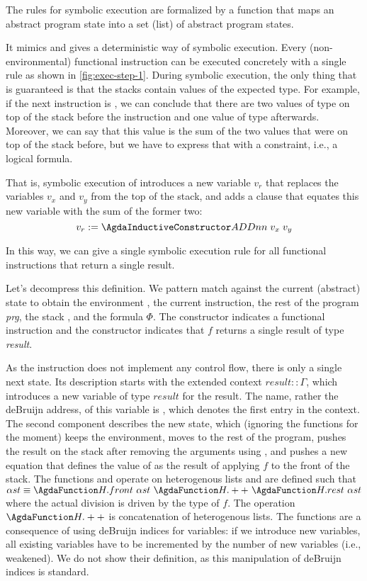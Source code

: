 The rules for symbolic execution are formalized by a function that
maps an abstract program state into a set (list) of abstract program states.
\AbstractProgStep

It mimics  and gives a deterministic way of symbolic execution.
Every (non-environmental) functional instruction can be executed concretely
with a single rule as shown in \autoref{fig:exec-step-1}.
During symbolic execution, the only thing that is guaranteed is
that the stacks contain values of the expected type.
For example, if the next instruction is , we can conclude
that there are two values of type  on top of the stack
before the instruction and one value of type 
afterwards. Moreover, we can say that this value is the sum of the two
values that were on top of the stack before, but we have to express
that with a constraint, i.e., a logical formula.

That is, symbolic execution of  introduces a new variable $v_r$ that replaces the
variables $v_x$ and  $v_y$ from the top of the stack,
and adds a clause that equates this new variable with the sum of the former two:
\[	v_r := \ACon{ADDnn}\; v_x\; v_y
\]

In this way, we can give a single symbolic execution rule for all
functional instructions that return a single result.
\AbstractProgStepDOne

Let's decompress this definition. We pattern match against the current
(abstract) state to obtain the environment {\Aaen}, the current
instruction, the rest of the program \textit{prg}, the stack {\Aast}, and the formula $\Phi$. The
constructor  indicates a functional instruction and the
constructor  indicates that $f$ returns a single result of
type \emph{result}.

As the instruction does not implement any control flow, there is only
a single next state. Its description starts with the extended context
$result :: \Gamma$, which introduces a new variable of type $result$
for the result. The name, rather the deBruijn address, of this
variable is \AZERO, which denotes the first entry in the context. The
second component describes the new state, which (ignoring the
 functions for the moment) keeps the environment, moves to
the rest of the program, pushes the result on the stack after removing
the arguments using , and pushes a new equation that
defines the value of {\AZERO} as the result of applying $f$ to the
front of the stack.
The functions  and  operate on heterogenous
lists and are defined such that
$\Aast \equiv \AFun{H.front}~\Aast~\AFun{H.++}~\AFun{H.rest}~\Aast$ where
the actual division is driven by the type of $f$. The operation
$\AFun{H.++}$ is concatenation of heterogenous lists.
The  functions are a consequence of using deBruijn indices
for variables: if we introduce new variables, all existing variables
have to be incremented by the number of new variables (i.e.,
weakened). We do not show their definition, 
as this manipulation of deBruijn indices is standard.

